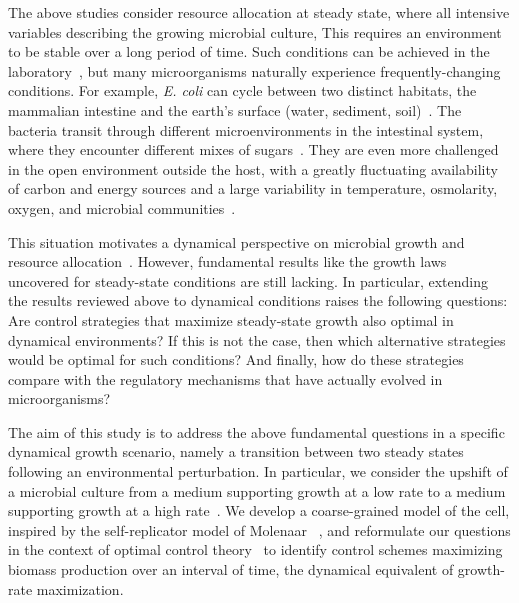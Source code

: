 The above studies consider resource allocation at steady state, where all intensive variables describing the growing microbial culture, 
This requires an environment to be stable over a long period of time.
Such conditions can be achieved in the laboratory~\cite{borirak_molecular_2014}, but many microorganisms naturally experience frequently-changing conditions.
For example, \textit{E. coli} can cycle between two distinct habitats, the mammalian intestine and the earth's surface (water, sediment, soil)~\cite{savageau_escherichia_1983}.
The bacteria transit through different microenvironments in the intestinal system, where they encounter different mixes of sugars~\cite{savageau_demand_1998}.
They are even more challenged in the open environment outside the host, with a greatly fluctuating availability of carbon and energy sources and a large variability in temperature, osmolarity, oxygen, and microbial communities~\cite{blount_unexhausted_2015,vanelsas_survival_2011}.

This situation motivates a dynamical perspective on microbial growth and resource allocation~\cite{pavlov_optimal_2013,vandenberg_optimal_1998,waldherr_dynamic_2015,ehrenberg_mediumdependent_2012}. However, fundamental results like the growth laws uncovered for steady-state conditions are still lacking.
In particular, extending the results reviewed above to dynamical conditions raises the following questions:
Are control strategies that maximize steady-state growth also optimal in dynamical environments?
If this is not the case, then which alternative strategies would be optimal for such conditions?
And finally, how do these strategies compare with the regulatory mechanisms that have actually evolved in microorganisms?

The aim of this study is to address the above fundamental questions in a specific dynamical growth scenario, namely a transition between two steady states following an environmental perturbation.
In particular, we consider the upshift of a microbial culture from a medium supporting growth at a low rate to a medium supporting growth at a high rate~\cite{ehrenberg_mediumdependent_2012}.
We develop a coarse-grained model of the cell, inspired by the self-replicator model of Molenaar \etal~\cite{molenaar_shifts_2009}, and reformulate our questions in the context of optimal control theory~\cite{stengel_optimal_1994} to identify control schemes maximizing biomass production over an interval of time, the dynamical equivalent of growth-rate maximization.

